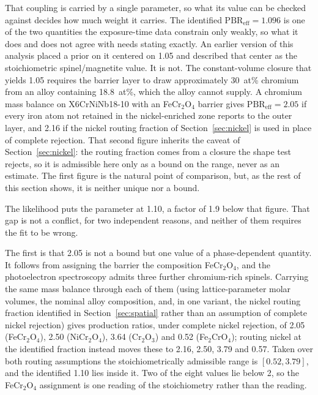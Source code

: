 \documentclass[a4paper,fleqn]{cas-sc}
\begin{document}
That coupling is carried by a single parameter, so what its value can
be checked against decides how much weight it carries. The identified
$\mathrm{PBR}_\text{eff} = 1.096$ is one of the two
quantities the exposure-time data constrain only weakly, so what it does
and does not agree with needs stating exactly. An earlier
version of this analysis placed a prior on it centered on 1.05 and
described that center as the stoichiometric spinel/magnetite value. It is
not. The constant-volume closure that yields 1.05 requires the barrier
layer to draw approximately 30~at\% chromium from an alloy containing
18.8~at\%, which the alloy cannot supply. A chromium mass balance on
X6CrNiNb18-10 with an FeCr$_2$O$_4$ barrier gives
$\mathrm{PBR}_\text{eff} = 2.05$ if every iron atom not retained in the
nickel-enriched zone reports to the outer layer, and 2.16 if the nickel routing fraction of Section~\ref{sec:nickel} is used in place of complete rejection. That second figure inherits the caveat of Section~\ref{sec:nickel}: the routing fraction comes from a closure the shape test rejects, so it is admissible here only as a bound on the range, never as an estimate. The first figure is the natural point of comparison, but, as the rest of this section shows, it is neither unique nor a bound.

The likelihood puts the parameter at 1.10, a factor of 1.9 below that
figure. That gap is not a conflict, for two independent reasons, and
neither of them requires the fit to be wrong.

The first is that 2.05 is not a bound but one value of a
phase-dependent quantity. It follows from assigning the barrier the
composition FeCr$_2$O$_4$, and the photoelectron spectroscopy admits
three further chromium-rich spinels. Carrying the same mass balance
through each of them (using lattice-parameter molar volumes, the
nominal alloy composition, and, in one variant, the nickel routing
fraction identified in Section~\ref{sec:spatial} rather than an
assumption of complete nickel rejection) gives production ratios, under complete nickel
rejection, of 2.05 (FeCr$_2$O$_4$), 2.50 (NiCr$_2$O$_4$), 3.64
(Cr$_2$O$_3$) and 0.52 (Fe$_2$CrO$_4$); routing nickel at the identified
fraction instead moves these to 2.16, 2.50, 3.79 and 0.57. Taken over
both routing assumptions the stoichiometrically admissible range is
$[0.52, 3.79]$, and the identified 1.10 lies inside it. Two of the eight values lie below 2, so the FeCr$_2$O$_4$ assignment is one reading
of the stoichiometry rather than the reading.
\end{document}
